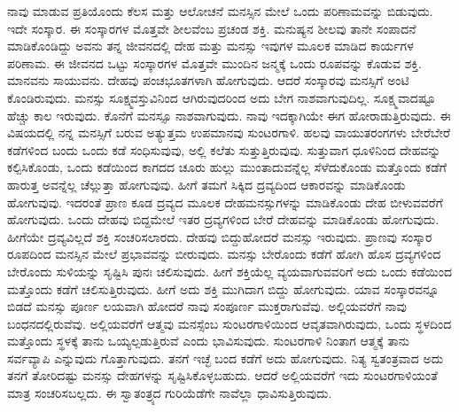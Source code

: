 ನಾವು ಮಾಡುವ ಪ್ರತಿಯೊಂದು ಕೆಲಸ ಮತ್ತು ಆಲೋಚನೆ ಮನಸ್ಸಿನ ಮೇಲೆ ಒಂದು ಪರಿಣಾಮವನ್ನು ಬಿಡುವುದು. ಇದೇ ಸಂಸ್ಕಾರ. ಈ ಸಂಸ್ಕಾರಗಳ ಮೊತ್ತವೇ ಶೀಲವೆಂಬ ಪ್ರಚಂಡ ಶಕ್ತಿ. ಮನುಷ್ಯನ ಶೀಲವು ತಾನೇ ಸಂಪಾದನೆ ಮಾಡಿಕೊಂಡಿದ್ದು ಅವನು ತನ್ನ ಜೀವನದಲ್ಲಿ ದೇಹ ಮತ್ತು ಮನಸ್ಸು ಇವುಗಳ ಮೂಲಕ ಮಾಡಿದ ಕಾರ್ಯಗಳ ಪರಿಣಾಮ. ಈ ಜೀವನದ ಒಟ್ಟು ಸಂಸ್ಕಾರಗಳ ಮೊತ್ತವೇ ಮುಂದಿನ ಜನ್ಮಕ್ಕೆ ಒಂದು ರೂಪವನ್ನು ಕೊಡುವ ಶಕ್ತಿ. ಮಾನವನು ಸಾಯುವನು. ದೇಹವು ಪಂಚಭೂತಗಳಾಗಿ ಹೋಗುವುದು. ಆದರೆ ಸಂಸ್ಕಾರವು ಮನಸ್ಸಿಗೆ ಅಂಟಿ ಕೊಂಡಿರುವುದು. ಮನಸ್ಸು ಸೂಕ್ಷ್ಮವಸ್ತುವಿನಿಂದ ಆಗಿರುವುದರಿಂದ ಅದು ಬೇಗ ನಾಶವಾಗುವುದಿಲ್ಲ. ಸೂಕ್ಷ್ಮವಾದಷ್ಟೂ ಹೆಚ್ಚು ಕಾಲ ಇರುವುದು. ಕೊನೆಗೆ ಮನಸ್ಸೂ ನಾಶವಾಗುವುದು. ನಾವು ಇದಕ್ಕಾಗಿಯೇ ಈಗ ಹೋರಾಡುತ್ತಿರುವುದು. ಈ ವಿಷಯದಲ್ಲಿ ನನ್ನ ಮನಸ್ಸಿಗೆ ಬರುವ ಅತ್ಯುತ್ತಮ ಉಪಮಾನವು ಸುಂಟರಗಾಳಿ. ಹಲವು ವಾಯುತರಂಗಗಳು ಬೇರೆಬೇರೆ ಕಡೆಗಳಿಂದ ಬಂದು ಒಂದು ಕಡೆ ಸಂಧಿಸುವುವು, ಅಲ್ಲಿ ಕಲೆತು ಸುತ್ತುತ್ತಿರುವುವು. ಸುತ್ತುವಾಗ ಧೂಳಿನಿಂದ ದೇಹವನ್ನು ಕಲ್ಪಿಸಿಕೊಂಡು, ಒಂದು ಕಡೆಯಿಂದ ಕಾಗದದ ಚೂರು ಹುಲ್ಲು ಮುಂತಾದುವನ್ನೆಲ್ಲ ಸೆಳೆದುಕೊಂಡು ಮತ್ತೊಂದು ಕಡೆಗೆ ಹಾರುತ್ತ ಅವನ್ನೆಲ್ಲ ಚೆಲ್ಲುತ್ತಾ ಹೋಗುವುವು. ಹೀಗೆ ತಮಗೆ ಸಿಕ್ಕಿದ ದ್ರವ್ಯದಿಂದ ಆಕಾರವನ್ನು ಮಾಡಿಕೊಂಡು ಹೋಗುವುವು. ಇದರಂತೆ ಪ್ರಾಣ ಕೂಡ ದ್ರವ್ಯದ ಮೂಲಕ ದೇಹಮನಸ್ಸುಗಳನ್ನು ಮಾಡಿಕೊಂಡು ದೇಹ ಬೀಳುವವರೆಗೆ ಹೋಗುವುದು. ಒಂದು ದೇಹವು ಬಿದ್ದಮೇಲೆ ಇತರ ದ್ರವ್ಯಗಳಿಂದ ಬೇರೆ ದೇಹವನ್ನು ಮಾಡಿಕೊಂಡು ಹೋಗುವುದು. ಹೀಗೆಯೇ ದ್ರವ್ಯವಿಲ್ಲದೆ ಶಕ್ತಿ ಸಂಚರಿಸಲಾರದು. ದೇಹವು ಬಿದ್ದುಹೋದರೆ ಮನಸ್ಸು ಇರುವುದು. ಪ್ರಾಣವು ಸಂಸ್ಕಾರ ರೂಪದಿಂದ ಮನಸ್ಸಿನ ಮೇಲೆ ಪ್ರಭಾವವನ್ನು ಬೀರುವುದು. ಮನಸ್ಸು ಬೇರೊಂದು ಕಡೆಗೆ ಹೋಗಿ ಹೊಸ ದ್ರವ್ಯಗಳಿಂದ ಬೇರೊಂದು ಸುಳಿಯನ್ನು ಸೃಷ್ಟಿಸಿ ಪುನಃ ಚಲಿಸುವುದು. ಹೀಗೆ ಶಕ್ತಿಯೆಲ್ಲ ವ್ಯಯವಾಗುವವರಿಗೆ ಅದು ಒಂದು ಕಡೆಯಿಂದ ಮತ್ತೊಂದು ಕಡೆಗೆ ಚಲಿಸುತ್ತಿರುವುದು. ಹೀಗೆ ಅದು ಶಕ್ತಿ ಮುಗಿದಾಗ ಬಿದ್ದು ಹೋಗುವುದು. ಯಾವ ಸಂಸ್ಕಾರವನ್ನೂ ಬಿಡದೆ ಮನಸ್ಸು ಪೂರ್ಣ ಲಯವಾಗಿ ಹೋದರೆ ನಾವು ಸಂಪೂರ್ಣ ಮುಕ್ತರಾಗುವೆವು. ಅಲ್ಲಿಯವರೆಗೆ ನಾವು ಬಂಧನದಲ್ಲಿರುವೆವು. ಅಲ್ಲಿಯವರೆಗೆ ಆತ್ಮವು ಮನಸ್ಸೆಂಬ ಸುಂಟರಗಾಳಿಯಿಂದ ಆವೃತವಾಗಿರುವುದು, ಒಂದು ಸ್ಥಳದಿಂದ ಮತ್ತೊಂದು ಸ್ಥಳಕ್ಕೆ ತಾನು ಒಯ್ಯಲ್ಪಡುತ್ತಿರುವೆ ಎಂದು ಭಾವಿಸುವುದು. ಸುಂಟರಗಾಳಿ ನಿಂತಾಗ ಆತ್ಮಕ್ಕೆ ತಾನು ಸರ್ವವ್ಯಾಪಿ ಎನ್ನುವುದು ಗೊತ್ತಾಗುವುದು. ತನಗೆ ಇಚ್ಛೆ ಬಂದ ಕಡೆಗೆ ಅದು ಹೋಗುವುದು. ನಿತ್ಯ ಸ್ವತಂತ್ರವಾದ ಅದು ತನಗೆ ತೋರಿದಷ್ಟು ಮನಸ್ಸು ದೇಹಗಳನ್ನು ಸೃಷ್ಟಿಸಿಕೊಳ್ಳಬಹುದು. ಆದರೆ ಅಲ್ಲಿಯವರೆಗೆ ಇದು ಸುಂಟರಗಾಳಿಯಂತೆ ಮಾತ್ರ ಸಂಚರಿಸಬಲ್ಲದು. ಈ ಸ್ವಾತಂತ್ರ್ಯದ ಗುರಿಯೆಡೆಗೇ ನಾವೆಲ್ಲಾ ಧಾವಿಸುತ್ತಿರುವುದು.

